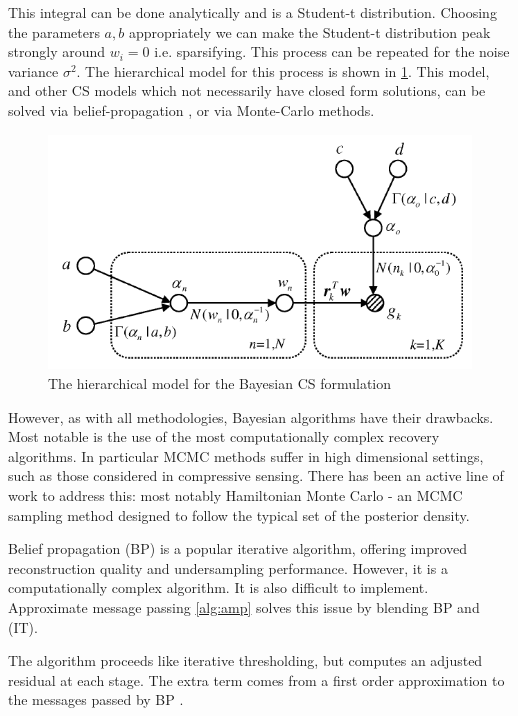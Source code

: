 \documentclass[12pt]{report}
\begin{document}
This integral can be done analytically and is a Student-t distribution. Choosing the parameters \(a,b\) appropriately we can make the Student-t distribution peak strongly around \(w_i = 0\) i.e. sparsifying. This process can be repeated for the noise variance \(\sigma^2\). The hierarchical model for this process is shown in \ref{bayesiancs}. This model, and other CS models which not necessarily have closed form solutions, can be solved via belief-propagation \cite{Baron2010}, or via Monte-Carlo methods.

\begin{figure}[h]
\centering
\includegraphics[height = 7 cm]{bayesiancs.png}
\caption{The hierarchical model for the Bayesian CS formulation \cite{Ji2008}}
\label{bayesiancs}
\end{figure}

However, as with all methodologies, Bayesian algorithms have their drawbacks. Most notable is the use of the most computationally complex recovery algorithms. In particular MCMC methods suffer in high dimensional settings, such as those considered in compressive sensing. There has been an active line of work to address this: most notably Hamiltonian Monte Carlo - an MCMC sampling method designed to follow the typical set of the posterior density. 

Belief propagation (BP) \cite{Yedidia2011} is a popular iterative algorithm, offering improved reconstruction quality and undersampling performance. However, it is a computationally complex algorithm. It is also difficult to implement. Approximate message passing \eqref{alg:amp} solves this issue by blending BP and (IT).

The algorithm proceeds like iterative thresholding, but computes an adjusted residual at each stage. The extra term comes from a first order approximation to the messages passed by BP \cite{metzler2014denoising}.
\end{document}

